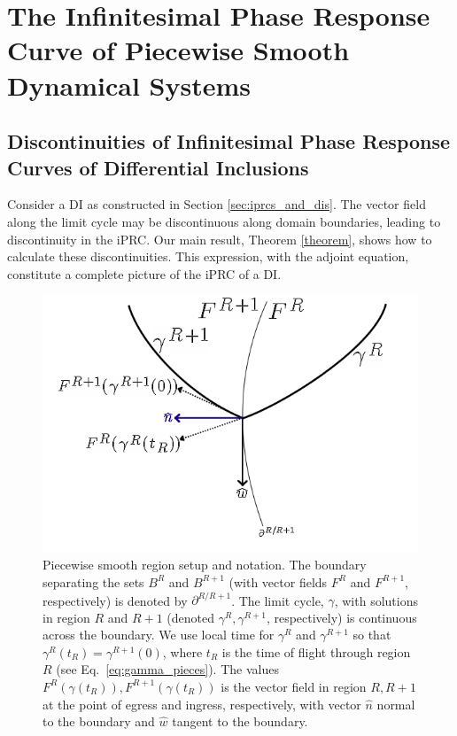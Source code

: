 \documentclass[12pt]{article}
\begin{document}
\section[The iPRC of Piecewise Smooth Dynamical Systems]{The Infinitesimal Phase Response Curve of Piecewise Smooth Dynamical Systems}%
\subsection{Discontinuities of Infinitesimal Phase Response Curves of Differential Inclusions}
Consider a DI as constructed in Section \ref{sec:iprcs_and_dis}.  The vector field along the limit cycle may be discontinuous along domain boundaries, leading to discontinuity in the iPRC.  Our main result, Theorem \ref{theorem}, shows how to calculate these discontinuities. This expression, with the adjoint equation, constitute a complete picture of the iPRC of a DI.  %

\begin{figure}[h!]
\begin{center}\includegraphics[width=.7\textwidth]{region_setup-revised.png}\end{center}
\caption[Piecewise smooth region setup and notation]{Piecewise smooth region setup and notation. The boundary separating the sets $B^R$ and $B^{R+1}$ (with vector fields $F^R$ and $F^{R+1}$, respectively) is denoted by $\partial^{R/R+1}$.  The limit cycle, $\gamma$, with solutions in region $R$ and $R+1$ (denoted $\gamma^R, \gamma^{R+1}$, respectively) is continuous across the boundary.  We use local time for $\gamma^R$ and $\gamma^{R+1}$ so that $\gamma^R(t_R) = \gamma^{R+1}(0)$, where $t_R$ is the time of flight through region $R$ (see Eq.~\eqref{eq:gamma_pieces}).  The values $F^R(\gamma(t_R)), F^{R+1}(\gamma(t_R))$ is the vector field in region $R,R+1$ at the point of egress and ingress, respectively, with vector $\hat{n}$ normal to the boundary and $\hat{w}$ tangent to the boundary.}
\label{fig:region_setup}
\end{figure}
\end{document}
